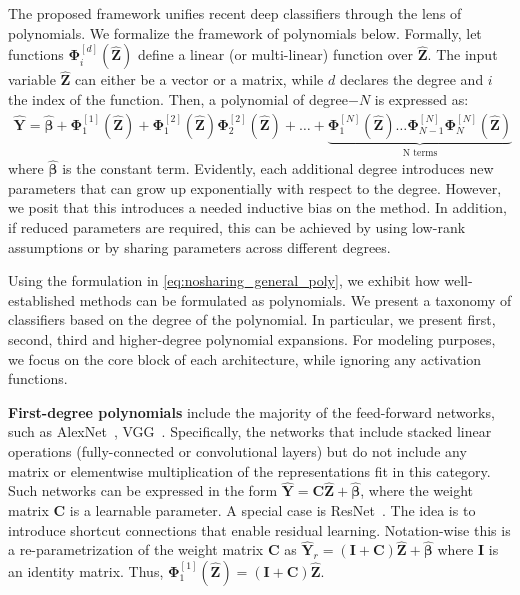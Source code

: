 \documentclass[runningheads]{llncs}
\newcommand{\resnet}{ResNet}
\providecommand{\minvar}{\bm{Z}}
\providecommand{\mvinvar}{\hat{\minvar}}
\providecommand{\matr}{\bm{\Phi}}
\providecommand{\matra}[2]{\matr_{#1}^{[#2]}}
\begin{document}
The proposed framework unifies recent deep classifiers through the lens of polynomials. 
We formalize the framework of polynomials below. Formally, let functions $\matra{i}{d} (\mvinvar)$ define a linear (or multi-linear) function over $\mvinvar$. The input variable  $\mvinvar$ can either be a vector or a matrix, while $d$ declares the degree and $i$ the index of the function. Then, a polynomial of degree$-N$ is expressed as: 
\begin{equation}
\begin{split}
    \hat{\bm{Y}} = \hat{\bm{\beta}} + \matra{1}{1} (\mvinvar) + \matra{1}{2} (\mvinvar) \matra{2}{2} (\mvinvar) + \ldots + \underbrace{\matra{1}{N} (\mvinvar) \ldots \matra{N-1}{N}\matra{N}{N} (\mvinvar)}_\text{N terms}
\end{split}
\label{eq:nosharing_general_poly}
\end{equation}
where $\hat{\bm{\beta}}$ is the constant term. Evidently, each additional degree introduces new parameters that can grow up exponentially with respect to the degree. However, we posit that this introduces a needed inductive bias on the method. In addition, if reduced parameters are required, this can be achieved by using low-rank assumptions or by sharing parameters across different degrees. 



Using the formulation in \eqref{eq:nosharing_general_poly}, we exhibit how well-established methods can be formulated as polynomials. We present a taxonomy of classifiers based on the degree of the polynomial. In particular, we present first, second, third and higher-degree polynomial expansions. For modeling purposes, we focus on the core block of each architecture, while ignoring any activation functions.

\noindent\textbf{First-degree polynomials} include the majority of the feed-forward networks, such as AlexNet~\cite{krizhevsky2012imagenet}, VGG~\cite{simonyan2014very}. Specifically, the networks that include stacked linear operations (fully-connected or convolutional layers) but do not include any matrix or elementwise multiplication of the representations fit in this category. Such networks can be expressed in the form $\hat{\bm{Y}} = \bm{C}\mvinvar + \hat{\bm{\beta}}$, where the weight matrix $\bm{C}$ is a learnable parameter. A special case is \resnet~\cite{he2015deep}. The idea is to introduce shortcut connections that enable residual learning. Notation-wise this is a re-parametrization of the weight matrix $\bm{C}$ as $\hat{\bm{Y}}_r = (\bm{I} + \bm{C})\mvinvar + \hat{\bm{\beta}}$ where $\bm{I}$ is an identity matrix. Thus, $\matra{1}{1}(\mvinvar) = (\bm{I} + \bm{C})\mvinvar$.
\end{document}
